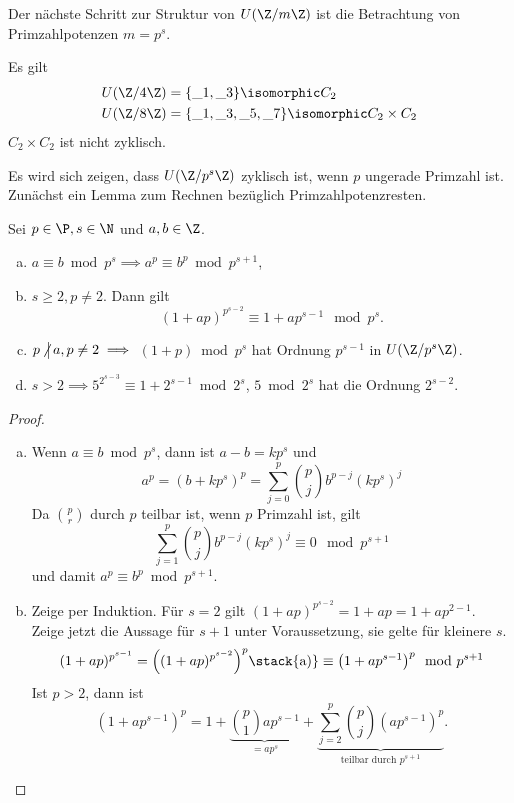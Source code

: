 Der nächste Schritt zur Struktur von $U(\Z / m \Z)$ ist die Betrachtung von Primzahlpotenzen $m = p^s$.

\begin{ex*}
	Es gilt
	\begin{align*}
		U(\Z / 4 \Z) &= \{ \_ 1, \_ 3 \} \isomorphic C_2 \\
		U(\Z / 8 \Z) &= \{ \_ 1, \_ 3, \_ 5, \_ 7 \} \isomorphic C_2 \times C_2
	\end{align*}
	$C_2 \times C_2$ ist nicht zyklisch.
\end{ex*}

Es wird sich zeigen, dass $U(\Z / p^s \Z)$ zyklisch ist, wenn $p$ ungerade Primzahl ist.
Zunächst ein Lemma zum Rechnen bezüglich Primzahlpotenzresten.

\begin{lem} \label{2.7}
	Sei $p \in \P, s \in \N$ und $a, b \in \Z$.
	\begin{enumerate}[a)]
		\item
			$a \equiv b \bmod p^s \implies a^p \equiv b^p \bmod p^{s+1}$,
		\item
			$s \ge 2, p\neq 2$.
			Dann gilt
			\[
				(1 + ap)^{p^{s-2}}
				\equiv 1 + ap^{s-1} \mod p^s.
			\]
		\item
			$p \ndivs a, p \neq 2 \implies $ $(1+p) \bmod p^s$ hat Ordnung $p^{s-1}$ in $U(\Z / p^s \Z)$.
		\item
			$s > 2 \implies 5^{2^{s-3}} \equiv 1 + 2^{s-1} \bmod 2^s$, $5 \bmod 2^s$ hat die Ordnung $2^{s-2}$.
	\end{enumerate}
	\begin{proof}
		\begin{enumerate}[a)]
			\item
				Wenn $a \equiv b \bmod p^s$, dann ist $a - b = k p^s$ und
				\[
					a^p
					= (b + kp^s)^p
					= \sum_{j=0}^p \binom{p}{j} b^{p-j} (kp^s)^j
				\]
				Da $\binom{p}{r}$ durch $p$ teilbar ist, wenn $p$ Primzahl ist, gilt
				\[
					\sum_{j=1}^p \binom{p}{j} b^{p-j} (kp^s)^j \equiv 0 \mod p^{s+1}
				\]
				und damit $a^p \equiv b^p \bmod p^{s+1}$.
			\item
{}
				Zeige per Induktion.
				Für $s = 2$ gilt $(1 + ap)^{p^{s-2}} = 1 + ap = 1 + ap^{2-1}$.
				Zeige jetzt die Aussage für $s + 1$ unter Voraussetzung, sie gelte für kleinere $s$.
				\[
					(1 + ap)^{p^{s-1}}
					= \Big((1 + ap)^{p^{s-2}}\Big)^p
					\stack{\text{a)}}\equiv \big(1 + ap^{s-1} \big)^p \mod p^{s+1}
				\]
				Ist $p > 2$, dann ist
				\[
					(1 + ap^{s-1})^p
					= 1 + \underbrace{\binom{p}{1} ap^{s-1}}_{= ap^s} + \underbrace{\sum_{j=2}^p \binom{p}{j} (ap^{s-1})^p}_{\text{teilbar durch $p^{s+1}$}}.
\]
\end{enumerate}
\end{proof}
\end{lem}
